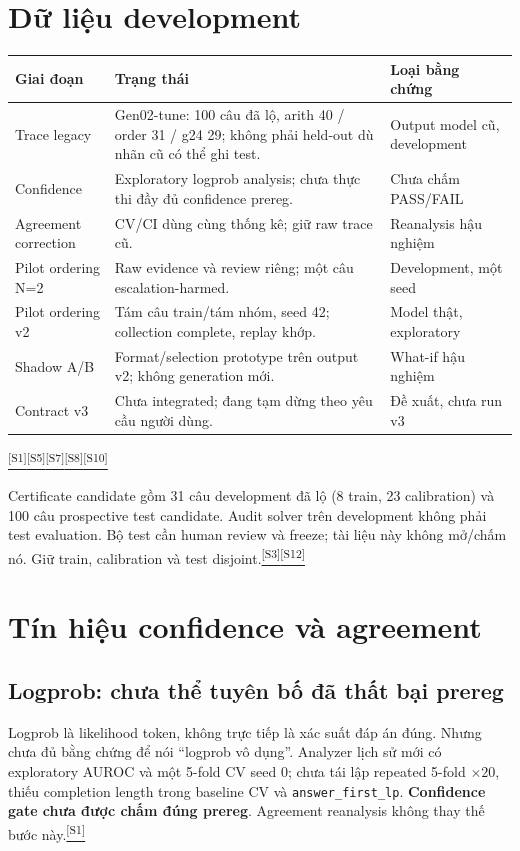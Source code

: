 \documentclass[11pt,a4paper]{article}
\newcommand{\src}[1]{\hyperlink{src-#1}{\textcolor{muted}{\textsuperscript{[S#1]}}}}
\begin{document}
\section{Dữ liệu development}
\begin{tabularx}{\textwidth}{@{}p{33mm}Yp{38mm}@{}}
\toprule
\textbf{Giai đoạn} & \textbf{Trạng thái} & \textbf{Loại bằng chứng}\\
\midrule
Trace legacy & Gen02-tune: 100 câu đã lộ, arith 40 / order 31 / g24 29; không phải held-out dù nhãn cũ có thể ghi test. & Output model cũ, development\\
Confidence & Exploratory logprob analysis; chưa thực thi đầy đủ confidence prereg. & Chưa chấm PASS/FAIL\\
Agreement correction & CV/CI dùng cùng thống kê; giữ raw trace cũ. & Reanalysis hậu nghiệm\\
Pilot ordering N=2 & Raw evidence và review riêng; một câu escalation-harmed. & Development, một seed\\
Pilot ordering v2 & Tám câu train/tám nhóm, seed 42; collection complete, replay khớp. & Model thật, exploratory\\
Shadow A/B & Format/selection prototype trên output v2; không generation mới. & What-if hậu nghiệm\\
Contract v3 & Chưa integrated; đang tạm dừng theo yêu cầu người dùng. & Đề xuất, chưa run v3\\
\bottomrule
\end{tabularx}
\src{1}\src{5}\src{7}\src{8}\src{10}

Certificate candidate gồm 31 câu development đã lộ (8 train, 23 calibration) và 100 câu prospective test candidate. Audit solver trên development không phải test evaluation. Bộ test cần human review và freeze; tài liệu này không mở/chấm nó. Giữ train, calibration và test disjoint.\src{3}\src{12}

\section{Tín hiệu confidence và agreement}
\subsection{Logprob: chưa thể tuyên bố đã thất bại prereg}
Logprob là likelihood token, không trực tiếp là xác suất đáp án đúng. Nhưng chưa đủ bằng chứng để nói “logprob vô dụng”. Analyzer lịch sử mới có exploratory AUROC và một 5-fold CV seed 0; chưa tái lập repeated 5-fold $\times20$, thiếu completion length trong baseline CV và \texttt{answer\_first\_lp}. \textbf{Confidence gate chưa được chấm đúng prereg}. Agreement reanalysis không thay thế bước này.\src{1}
\end{document}

